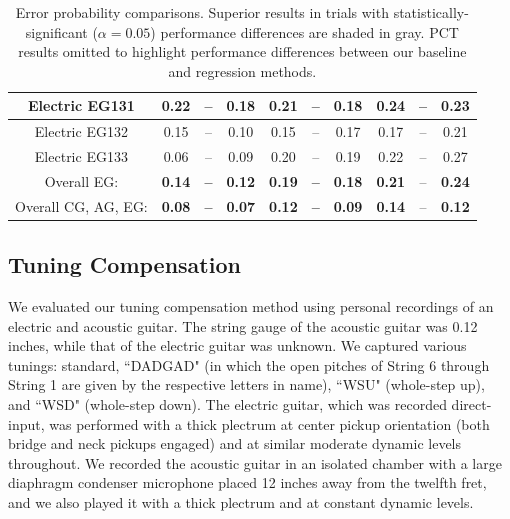 \documentclass[convention,peer-reviewed]{aesconf}
\begin{document}
\begin{table}[!htbp]
\begin{center}
\begin{tabular} {||c||c|c|c||c|c|c||c|c|c||}
\hline
\hline
Electric EG131 & 0.22 & -- & 0.18 & 0.21 & -- & 0.18 & 0.24 & -- & 0.23\\
\hline
Electric EG132 & 0.15 & -- & \cellcolor[gray]{0.8}0.10 & 0.15 & -- & 0.17 & \cellcolor[gray]{0.8}0.17 & -- & 0.21\\
\hline
Electric EG133 & 0.06 & -- & 0.09 & 0.20 & --  & 0.19 & \cellcolor[gray]{0.8}0.22 & -- & 0.27 \\
\hline
Overall EG: & \bf{0.14} & \bf{--} & \cellcolor[gray]{0.8}\bf{0.12} & \bf{0.19} & \bf{--} & \bf{0.18} & \cellcolor[gray]{0.8}\bf{0.21} & -- & \bf{0.24}\\
\hline
\hline
\hline
Overall CG, AG, EG: & \bf{0.08} & \bf{--} & \cellcolor[gray]{0.8}\bf{0.07} & \bf{0.12} & \bf{--} & \cellcolor[gray]{0.8}\bf{0.09} & \bf{0.14} & -- & \cellcolor[gray]{0.8}\bf{0.12}\\
\hline
\end{tabular}
\caption{Error probability comparisons. Superior results in trials with statistically-significant ($\alpha=0.05$) performance differences are shaded in gray. PCT results omitted to highlight performance differences between our baseline and regression methods.}
\label{tab:mcnemar-RWC}
\end{center}
\end{table}

\subsection{Tuning Compensation}
We evaluated our tuning compensation method using personal recordings of an electric and acoustic guitar. The string gauge of the acoustic guitar was 0.12 inches, while that of the electric guitar was unknown. We captured various tunings: standard, ``DADGAD" (in which the open pitches of String 6 through String 1 are given by the respective letters in name), ``WSU" (whole-step up), and ``WSD" (whole-step down). The electric guitar, which was recorded direct-input, was performed with a thick plectrum at center pickup orientation (both bridge and neck pickups engaged) and at similar moderate dynamic levels throughout. We recorded the acoustic guitar in an isolated chamber with a large diaphragm condenser microphone placed 12 inches away from the twelfth fret, and we also played it with a thick plectrum and at constant dynamic levels.
\end{document}
